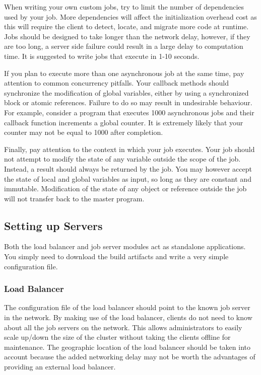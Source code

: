When writing your own custom jobs, try to limit the number of
dependencies used by your job.
More dependencies will affect the initialization overhead cost
as this will require the client to detect, locate, and migrate
more code at runtime.
Jobs should be designed to take longer than the network
delay, however, if they are too long, a server side failure
could result in a large delay to computation time.
It is suggested to write jobs that execute in 1-10 seconds.

If you plan to execute more than one asynchronous job at the
same time, pay attention to common concurrency pitfalls.
Your callback methods should synchronize the modification
of global variables, either by using a synchronized block or
atomic references.
Failure to do so may result in undesirable behaviour.
For example, consider a program that executes 1000 asynchronous
jobs and their callback function increments a global counter.
It is extremely likely that your counter may not be equal to 1000
after completion.

Finally, pay attention to the context in which your job executes.
Your job should not attempt to modify the state of any variable
outside the scope of the job.
Instead, a result should always be returned by the job.
You may however accept the state of local and global variables
as input, so long as they are constant and immutable.
Modification of the state of any object or reference outside the job
will not transfer back to the master program.

\subsection{Setting up Servers}\label{subsec:settingUpServers}

Both the load balancer and job server modules act as standalone
applications.
You simply need to download the build artifacts and write
a very simple configuration file.


\subsubsection{Load Balancer}

The configuration file of the load balancer should point
to the known job server in the network.
By making use of the load balancer, clients do not
need to know about all the job servers on the network.
This allows administrators to easily scale up/down the
size of the cluster without taking the clients offline for
maintenance.
The geographic location of the load balancer should
be taken into account because the added networking delay
may not be worth the advantages of providing an external
load balancer.

